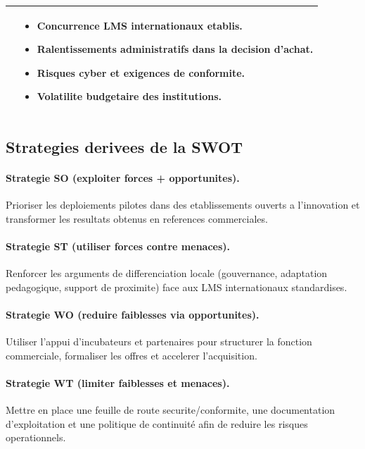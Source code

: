 ﻿\documentclass[12pt,a4paper,oneside]{report}
\begin{document}
\begin{table}[H]
\begin{tabular}{|p{6.2cm}|p{6.2cm}|}
\begin{itemize}
\end{itemize}
&
\begin{itemize}
  \item Concurrence LMS internationaux etablis.
  \item Ralentissements administratifs dans la decision d'achat.
  \item Risques cyber et exigences de conformite.
  \item Volatilite budgetaire des institutions.
\end{itemize}
\\
\hline
\end{tabular}
\end{table}

\subsection{Strategies derivees de la SWOT}

\paragraph{Strategie SO (exploiter forces + opportunites).}
Prioriser les deploiements pilotes dans des etablissements ouverts a l'innovation et transformer les resultats obtenus en references commerciales.

\paragraph{Strategie ST (utiliser forces contre menaces).}
Renforcer les arguments de differenciation locale (gouvernance, adaptation pedagogique, support de proximite) face aux LMS internationaux standardises.

\paragraph{Strategie WO (reduire faiblesses via opportunites).}
Utiliser l'appui d'incubateurs et partenaires pour structurer la fonction commerciale, formaliser les offres et accelerer l'acquisition.

\paragraph{Strategie WT (limiter faiblesses et menaces).}
Mettre en place une feuille de route securite/conformite, une documentation d'exploitation et une politique de continuité afin de reduire les risques operationnels.
\end{document}
